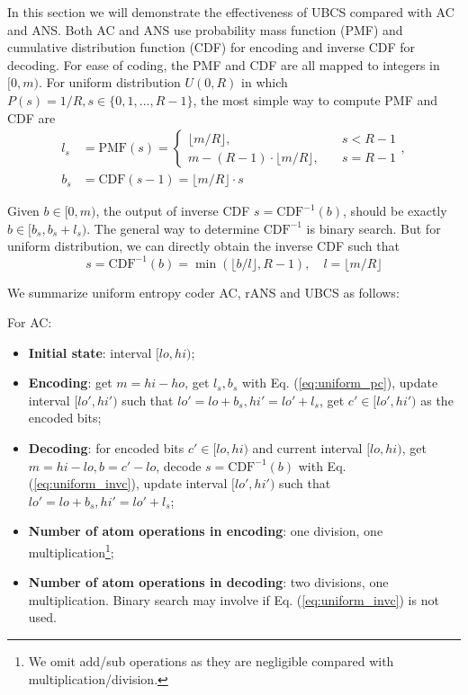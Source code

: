 \documentclass{article}
\begin{document}
In this section we will demonstrate the effectiveness of UBCS compared with AC and ANS. Both AC and ANS use probability mass function (PMF) and cumulative distribution function (CDF) for encoding and inverse CDF for decoding. For ease of coding, the PMF and CDF are all mapped to integers in $[0, m)$. For uniform distribution $U(0, R)$ in which $P(s) = 1 / R, s \in \{0, 1, ..., R-1 \}$, the most simple way to compute PMF and CDF are
\begin{equation}
\begin{split}
l_s &= \mathrm{PMF}(s) =
\begin{cases}
\lfloor m / R \rfloor, &\quad s < R-1 \\
m - (R-1) \cdot \lfloor m / R \rfloor, &\quad s = R-1
\end{cases}, \\
b_s &= \mathrm{CDF}(s-1) = \lfloor m / R \rfloor \cdot s
\end{split}
\label{eq:uniform_pc}
\end{equation}

Given $b \in [0, m)$, the output of inverse CDF $s = \mathrm{CDF}^{-1}(b)$, should be exactly $b \in [b_s, b_s + l_s)$. The general way to determine $\mathrm{CDF}^{-1}$ is binary search. But for uniform distribution, we can directly obtain the inverse CDF such that
\begin{equation}
s = \mathrm{CDF}^{-1} (b) = \min (\lfloor b / l \rfloor, R-1), \quad l = \lfloor m / R \rfloor
\label{eq:uniform_invc}
\end{equation}

We summarize uniform entropy coder AC, rANS and UBCS as follows:

For AC:
\begin{itemize}
    \item {\bf Initial state}: interval $[lo, hi)$;
    \item {\bf Encoding}: get $m = hi - ho$, get $l_s, b_s$ with Eq. (\ref{eq:uniform_pc}), update interval $[lo', hi')$ such that $lo' = lo + b_s, hi' = lo' + l_s$, get $c' \in [lo', hi')$ as the encoded bits; 
    \item {\bf Decoding}: for encoded bits $c' \in [lo, hi)$ and current interval $[lo, hi)$, get $m = hi - lo, b = c' - lo$, decode $s = \mathrm{CDF}^{-1} (b)$ with Eq. (\ref{eq:uniform_invc}), update interval $[lo', hi')$ such that $lo' = lo + b_s, hi' = lo' + l_s$;
    \item {\bf Number of atom operations in encoding}: one division, one multiplication\footnote{We omit add/sub operations as they are negligible compared with multiplication/division.};
    \item {\bf Number of atom operations in decoding}: two divisions, one multiplication. Binary search may involve if Eq. (\ref{eq:uniform_invc}) is not used. 
\end{itemize}
\end{document}
